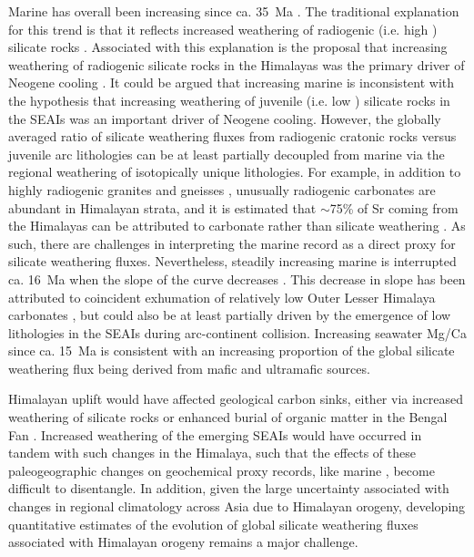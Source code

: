 Marine \SrSr has overall been increasing since ca. 35~Ma \citep{McArthur2012a}. The traditional explanation for this trend is that it reflects increased weathering of radiogenic (i.e. high \SrSr) silicate rocks \citep{Raymo1988a, Edmond1992a}. Associated with this explanation is the proposal that increasing weathering of radiogenic silicate rocks in the Himalayas was the primary driver of Neogene cooling \citep{Raymo1992a}. It could be argued that increasing marine \SrSr is inconsistent with the hypothesis that increasing weathering of juvenile (i.e. low \SrSr) silicate rocks in the SEAIs was an important driver of Neogene cooling. However, the globally averaged ratio of silicate weathering fluxes from radiogenic cratonic rocks versus juvenile arc lithologies can be at least partially decoupled from marine \SrSr via the regional weathering of isotopically unique lithologies. For example, in addition to highly radiogenic granites and gneisses \citep{Edmond1992a}, unusually radiogenic carbonates are abundant in Himalayan strata, and it is estimated that $\sim$75\% of Sr coming from the Himalayas can be attributed to carbonate rather than silicate weathering \citep{Jacobson2002a, Quade2003a, Oliver2003a}. As such, there are challenges in interpreting the marine \SrSr record as a direct proxy for silicate weathering fluxes. Nevertheless, steadily increasing marine \SrSr is interrupted ca. 16~Ma when the slope of the \SrSr curve decreases \citep{McArthur2012a}. This decrease in slope has been attributed to coincident exhumation of relatively low \SrSr Outer Lesser Himalaya carbonates \citep{Myrow2015a, Colleps2018a}, but could also be at least partially driven by the emergence of low \SrSr lithologies in the SEAIs during arc-continent collision. Increasing seawater Mg/Ca since ca. 15~Ma \citep{Higgins2012a} is consistent with an increasing proportion of the global silicate weathering flux being derived from mafic and ultramafic sources.

Himalayan uplift would have affected geological carbon sinks, either via increased weathering of silicate rocks \citep{Raymo1992a} or enhanced burial of organic matter in the Bengal Fan \citep{Galy2007a}. Increased weathering of the emerging SEAIs would have occurred in tandem with such changes in the Himalaya, such that the effects of these paleogeographic changes on geochemical proxy records, like marine \SrSr, become difficult to disentangle. In addition, given the large uncertainty associated with changes in regional climatology across Asia due to Himalayan orogeny, developing quantitative estimates of the evolution of global silicate weathering fluxes associated with Himalayan orogeny remains a major challenge.


